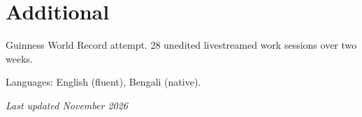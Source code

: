 \documentclass[10pt,a4paper]{article}
\newcommand{\cvitem}[3]{%
  \begin{list}{}{%
    \setlength{\leftmargin}{2.35cm}%
    \setlength{\labelwidth}{2.1cm}%
    \setlength{\labelsep}{0.25cm}%
    \setlength{\itemindent}{0pt}%
    \setlength{\listparindent}{0pt}%
    \setlength{\rightmargin}{0pt}%
    \setlength{\topsep}{0pt}%
    \setlength{\partopsep}{0pt}%
    \setlength{\parsep}{0pt}%
    \setlength{\itemsep}{0pt}%
  }%
  \item[{\makebox[2.1cm][l]{\footnotesize\color{muted}#1}}]%
  #2
  #3
  \end{list}%
  \vspace{1pt}
}
\begin{document}
\section*{Additional}
\cvitem{Nov 2024}{Guinness World Record attempt. 28 unedited livestreamed work sessions over two weeks.}{}
\cvitem{}{Languages: English (fluent), Bengali (native).}{}

\vfill
\begin{flushright}
  \footnotesize\color{muted}\textit{Last updated November 2026}
\end{flushright}
\end{document}
